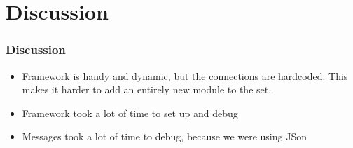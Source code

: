 \documentclass{beamer}
\begin{document}
{
      \begin{frame}
      \end{frame}
}
{
      \begin{frame}
      \end{frame}
}

\section{Discussion}
\begin{frame}
\frametitle{Discussion}
\begin{itemize}
\item Framework is handy and dynamic, but the connections are hardcoded. This makes it
harder to add an entirely new module to the set.
\item Framework took a lot of time to set up and debug
\item Messages took a lot of time to debug, because we were using JSon
\end{itemize}
\end{frame}
\end{document}

